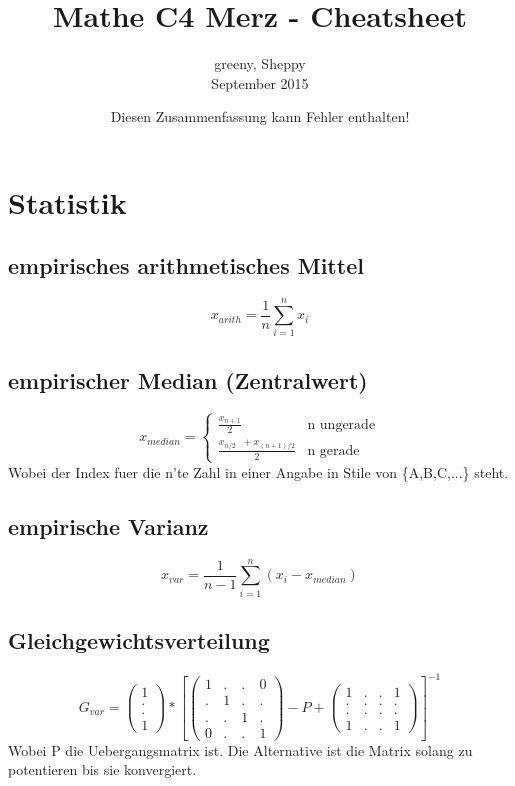 \documentclass{article}
\title{Mathe C4 Merz - Cheatsheet}
\author{greeny, Sheppy\\September 2015}
\date{Diesen Zusammenfassung kann Fehler enthalten!}
\begin{document}
\maketitle
\section{Statistik}
\subsection{empirisches arithmetisches Mittel}
\[x_{arith}=\frac{1}{n}\sum_{i=1}^n x_i\]
\subsection{empirischer Median (Zentralwert)}
\[
	x_{median}=
	\begin{cases}
		\frac{x_{n+1}}{2}								& \text{n ungerade} \\
		\frac{x_{n/2} \;\; + x_{(n+1)/2}}{2}	& \text{n gerade}
	\end{cases}
\]
Wobei der Index fuer die n'te Zahl in einer Angabe in Stile von \{A,B,C,...\} steht.
\subsection{empirische Varianz}
\[x_{var}=\frac{1}{n-1}\sum_{i=1}^n (x_i-x_{median})\]
\subsection{Gleichgewichtsverteilung}
\[
	G_{var} = 
	\begin{pmatrix}
		1 \\
		. \\
		. \\
		1
	\end{pmatrix}
	*\left [
		\begin{pmatrix}
			1&.&.& 0 \\
			. & 1 &.& . \\
			. & . &1& . \\
			0&.&.&1

		\end{pmatrix}-P+
		\begin{pmatrix}
			1&.&.&1 \\
			.&.&.&. \\
			.&.&.&. \\
			1&.&.&1
	\end{pmatrix}\right ]
	^{-1}
\]
Wobei P die Uebergangsmatrix ist. Die Alternative ist die Matrix solang zu potentieren bis sie konvergiert.
\end{document}
